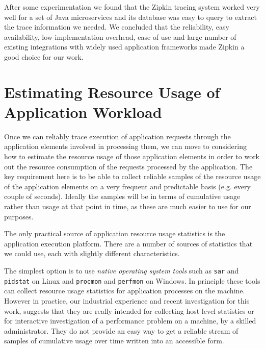 After some experimentation we found that the Zipkin tracing system worked very well for a set of Java microservices and its database was easy to query to extract the trace information we needed.  We concluded that the reliability, easy availability, low implementation overhead, ease of use and large number of existing integrations with widely used application frameworks made Zipkin a good choice for our work.

\section{Estimating Resource Usage of Application Workload}

Once we can reliably trace execution of application requests through the application elements involved in processing them, we can move to considering how to estimate the resource usage of those application elements in order to work out the resource consumption of the requests processed by the application.  The key requirement here is to be able to collect reliable samples of the resource usage of the application elements on a very frequent and predictable basis (e.g. every couple of seconds).  Ideally the samples will be in terms of cumulative usage rather than usage at that point in time, as these are much easier to use for our purposes.

The only practical source of application resource usage statistics is the application execution platform.  There are a number of sources of statistics that we could use, each with slightly different characteristics.

The simplest option is to use \emph{native operating system tools} such as \texttt{sar} and \texttt{pidstat} on Linux and \texttt{procmon} and \texttt{perfmon} on Windows.  In principle these tools can collect resource usage statistics for application processes on the machine.  However in practice, our industrial experience and recent investigation for this work, suggests that they are really intended for collecting host-level statistics or for interactive investigation of a performance problem on a machine, by a skilled administrator.  They do not provide an easy way to get a reliable stream of samples of cumulative usage over time written into an accessible form.

